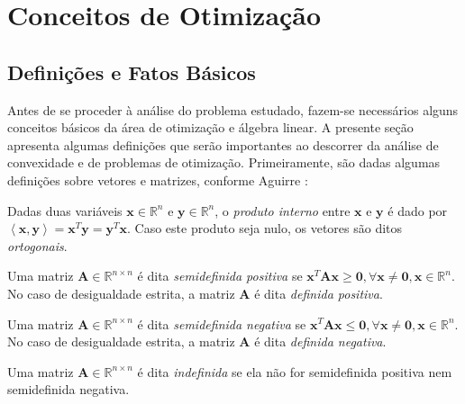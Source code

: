 
\section{Conceitos de Otimiza\c{c}\~{a}o}

\subsection{Defini\c{c}\~{o}es e Fatos B\'{a}sicos}
Antes de se proceder \`{a} an\'{a}lise do problema estudado, fazem-se necess\'{a}rios alguns conceitos b\'{a}sicos da \'{a}rea de otimiza\c{c}\~{a}o e \'{a}lgebra linear. A presente se\c{c}\~{a}o apresenta algumas defini\c{c}\~{o}es que ser\~{a}o importantes ao descorrer da an\'{a}lise de convexidade e de problemas de otimiza\c{c}\~{a}o. Primeiramente, s\~{a}o dadas algumas defini\c{c}\~{o}es sobre vetores e matrizes, conforme Aguirre \cite{aguirre}:
\begin{definition}\label{dotProd}
Dadas duas vari\'{a}veis $\mathbf{x} \in \mathbb{R}^{n}$ e $\mathbf{y} \in \mathbb{R}^{n}$, o \textit{produto interno} entre $\mathbf{x}$ e $\mathbf{y}$ \'{e} dado por $\left\langle \mathbf{x},\mathbf{y}\right\rangle = \mathbf{x}^{T}\mathbf{y} = \mathbf{y}^{T}\mathbf{x}$. Caso este produto seja nulo, os vetores s\~{a}o ditos \textit{ortogonais}.
\end{definition}
\begin{definition}
Uma matriz $\mathbf{A} \in \mathbb{R}^{n \times n}$ \'{e} dita \textit{semidefinida positiva} se $\mathbf{x}^{T}\mathbf{A}\mathbf{x} \ge \mathbf{0}, \forall\mathbf{x} \ne \mathbf{0}, \mathbf{x} \in \mathbb{R}^{n}$. No caso de desigualdade estrita, a matriz $\mathbf{A}$ \'{e} dita \textit{definida positiva}. 
\end{definition}

\begin{definition}
Uma matriz $\mathbf{A} \in \mathbb{R}^{n \times n}$ \'{e} dita \textit{semidefinida negativa} se $\mathbf{x}^{T}\mathbf{A}\mathbf{x} \le \mathbf{0}, \forall\mathbf{x} \ne \mathbf{0}, \mathbf{x} \in \mathbb{R}^{n}$. No caso de desigualdade estrita, a matriz $\mathbf{A}$ \'{e} dita \textit{definida negativa}. 
\end{definition}

\begin{definition}
Uma matriz $\mathbf{A} \in \mathbb{R}^{n \times n}$ \'{e} dita \textit{indefinida} se ela n\~{a}o for semidefinida positiva nem semidefinida negativa.
\end{definition}


